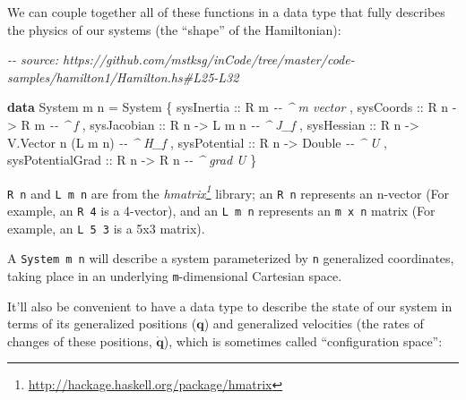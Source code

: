 \documentclass[]{article}
\newenvironment{Shaded}{}{}
\newcommand{\CommentTok}[1]{\textcolor[rgb]{0.38,0.63,0.69}{\textit{#1}}}
\newcommand{\DataTypeTok}[1]{\textcolor[rgb]{0.56,0.13,0.00}{#1}}
\newcommand{\KeywordTok}[1]{\textcolor[rgb]{0.00,0.44,0.13}{\textbf{#1}}}
\newcommand{\NormalTok}[1]{#1}
\newcommand{\OtherTok}[1]{\textcolor[rgb]{0.00,0.44,0.13}{#1}}
\renewcommand{\href}[2]{#2\footnote{\url{#1}}}
\begin{document}
We can couple together all of these functions in a data type that fully
describes the physics of our systems (the ``shape'' of the Hamiltonian):

\begin{Shaded}
\begin{Highlighting}[]
\CommentTok{{-}{-} source: https://github.com/mstksg/inCode/tree/master/code{-}samples/hamilton1/Hamilton.hs\#L25{-}L32}

\KeywordTok{data} \DataTypeTok{System}\NormalTok{ m n }\OtherTok{=} \DataTypeTok{System}
\NormalTok{    \{}\OtherTok{ sysInertia       ::} \DataTypeTok{R}\NormalTok{ m                         }\CommentTok{{-}{-} \^{} \textquotesingle{}m\textquotesingle{} vector}
\NormalTok{    ,}\OtherTok{ sysCoords        ::} \DataTypeTok{R}\NormalTok{ n }\OtherTok{{-}\textgreater{}} \DataTypeTok{R}\NormalTok{ m                  }\CommentTok{{-}{-} \^{} f}
\NormalTok{    ,}\OtherTok{ sysJacobian      ::} \DataTypeTok{R}\NormalTok{ n }\OtherTok{{-}\textgreater{}} \DataTypeTok{L}\NormalTok{ m n                }\CommentTok{{-}{-} \^{} J\_f}
\NormalTok{    ,}\OtherTok{ sysHessian       ::} \DataTypeTok{R}\NormalTok{ n }\OtherTok{{-}\textgreater{}} \DataTypeTok{V.Vector}\NormalTok{ n (}\DataTypeTok{L}\NormalTok{ m n)   }\CommentTok{{-}{-} \^{} H\_f}
\NormalTok{    ,}\OtherTok{ sysPotential     ::} \DataTypeTok{R}\NormalTok{ n }\OtherTok{{-}\textgreater{}} \DataTypeTok{Double}               \CommentTok{{-}{-} \^{} U}
\NormalTok{    ,}\OtherTok{ sysPotentialGrad ::} \DataTypeTok{R}\NormalTok{ n }\OtherTok{{-}\textgreater{}} \DataTypeTok{R}\NormalTok{ n                  }\CommentTok{{-}{-} \^{} grad U}
\NormalTok{    \}}
\end{Highlighting}
\end{Shaded}

\texttt{R\ n} and \texttt{L\ m\ n} are from the
\emph{\href{http://hackage.haskell.org/package/hmatrix}{hmatrix}} library; an
\texttt{R\ n} represents an n-vector (For example, an \texttt{R\ 4} is a
4-vector), and an \texttt{L\ m\ n} represents an \texttt{m\ x\ n} matrix (For
example, an \texttt{L\ 5\ 3} is a 5x3 matrix).

A \texttt{System\ m\ n} will describe a system parameterized by \texttt{n}
generalized coordinates, taking place in an underlying \texttt{m}-dimensional
Cartesian space.

It'll also be convenient to have a data type to describe the state of our system
in terms of its generalized positions (\(\mathbf{q}\)) and generalized
velocities (the rates of changes of these positions, \(\dot{\mathbf{q}}\)),
which is sometimes called ``configuration space'':
\end{document}
